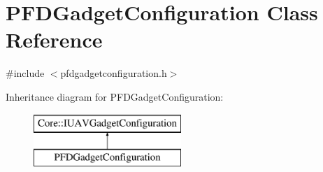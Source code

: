 \hypertarget{class_p_f_d_gadget_configuration}{\section{\-P\-F\-D\-Gadget\-Configuration \-Class \-Reference}
\label{class_p_f_d_gadget_configuration}
}


{\ttfamily \#include $<$pfdgadgetconfiguration.\-h$>$}

\-Inheritance diagram for \-P\-F\-D\-Gadget\-Configuration\-:\begin{figure}[H]
\begin{center}
\leavevmode
\includegraphics[height=2.000000cm]{class_p_f_d_gadget_configuration}
\end{center}
\end{figure}
